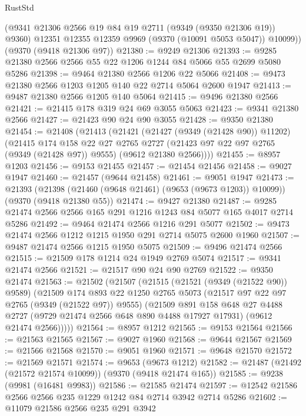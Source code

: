 \begin{lexlean}{RustStd}
\begin{coremodule}
        (@9341 @21306 @2566 @19 @84 @19 @2711 (@9349 (@9350 @21306 @19)) @9360)
        @12351
        @12355
        @12359
        @9969
        (@9370 (@10091 @5053 @5047))
        @10099))
    (@9370 (@9418 @21306 @97))
@21380 := @9249 @21306
@21393 := @9285 @21380 @2566 @2566 @55 @22 @1206 @1244 @84 @5066 @55 @2699 @5080 @5286
@21398 := @9464 @21380 @2566 @1206 @22 @5066
@21408 := @9473 @21380 @2566 @1203 @1205 @140 @22 @2714 @5064 @2600 @1947
@21413 := @9487 @21380 @2566 @1205 @140 @5064
@21415 := @9496 @21380 @2566
@21421 := @21415 @178 @319 @24 @69 @3055 @5063
@21423 := @9341 @21380 @2566
@21427 := @21423 @90 @24 @90 @3055
@21428 := @9350 @21380
@21454 := @21408
    (@21413
      (@21421
        (@21427 (@9349 (@21428 @90)) @11202)
        (@21415
          @174
          @158
          @22
          @27
          @2765
          @2727
          (@21423 @97 @22 @97 @2765 (@9349 (@21428 @97)) @9555)
          (@9612 @21380 @2566))))
@21455 := @8957 @1203
@21456 := @9153 @21455
@21457 := @21454 @21456
@21458 := @9027 @1947
@21460 := @21457 (@9644 @21458)
@21461 := @9051 @1947
@21473 := @21393
    (@21398 (@21460 (@9648 @21461) (@9653 (@9673 @1203)) @10099))
    (@9370 (@9418 @21380 @55))
@21474 := @9427 @21380
@21487 := @9285 @21474 @2566 @2566 @165 @291 @1216 @1243 @84 @5077 @165 @4017 @2714 @5286
@21492 := @9464 @21474 @2566 @1216 @291 @5077
@21502 := @9473 @21474 @2566 @1212 @1215 @1950 @291 @2714 @5075 @2600 @1960
@21507 := @9487 @21474 @2566 @1215 @1950 @5075
@21509 := @9496 @21474 @2566
@21515 := @21509 @178 @1214 @24 @1949 @2769 @5074
@21517 := @9341 @21474 @2566
@21521 := @21517 @90 @24 @90 @2769
@21522 := @9350 @21474
@21563 := @21502
    (@21507
      (@21515
        (@21521 (@9349 (@21522 @90)) @9589)
        (@21509
          @174
          @893
          @22
          @1250
          @2765
          @5073
          (@21517 @97 @22 @97 @2765 (@9349 (@21522 @97)) @9555)
          (@21509
            @891
            @158
            @648
            @27
            @4488
            @2727
            (@9729 @21474 @2566 @648 @890 @4488 @17927 @17931)
            (@9612 @21474 @2566)))))
@21564 := @8957 @1212
@21565 := @9153 @21564
@21566 := @21563 @21565
@21567 := @9027 @1960
@21568 := @9644 @21567
@21569 := @21566 @21568
@21570 := @9051 @1960
@21571 := @9648 @21570
@21572 := @21569 @21571
@21574 := @9653 (@9673 @1212)
@21582 := @21487 (@21492 (@21572 @21574 @10099)) (@9370 (@9418 @21474 @165))
@21585 := @9238 (@9981 (@16481 @9983))
@21586 := @21585 @21474
@21597 := @12542 @21586 @2566 @2566 @235 @1229 @1242 @84 @2714 @3942 @2714 @5286
@21602 := @11079 @21586 @2566 @235 @291 @3942

\end{coremodule}
\end{lexlean}
